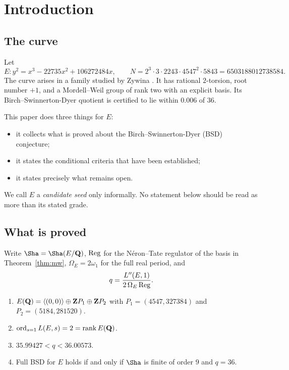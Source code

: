 \section{Introduction}\label{sec:intro}

\subsection{The curve}
Let
\[
E\colon y^2=x^3-22735x^2+106272484x,\qquad N=2^3\cdot3\cdot2243\cdot4547^2\cdot5843=6503188012738584 .
\]
The curve arises in a family studied by Zywina \cite{zywina}. It has rational $2$-torsion, root number $+1$, and a Mordell--Weil group of rank two with an explicit basis. Its Birch--Swinnerton-Dyer quotient is certified to lie within $0.006$ of $36$.

This paper does three things for $E$:
\begin{itemize}[leftmargin=*]
\item it collects what is proved about the Birch--Swinnerton-Dyer (BSD) conjecture;
\item it states the conditional criteria that have been established;
\item it states precisely what remains open.
\end{itemize}
We call $E$ a \emph{candidate seed} only informally. No statement below should be read as more than its stated grade.

\subsection{What is proved}
Write $\Sha=\Sha(E/\Q)$, $\operatorname{Reg}$ for the N\'eron--Tate regulator of the basis in Theorem~\ref{thm:mw}, $\Omega_E=2\omega_1$ for the full real period, and
\[
q=\frac{L''(E,1)}{2\,\Omega_E\operatorname{Reg}}.
\]

\begin{theorem}\label{thm:A}
\begin{enumerate}[label=(\roman*)]
\item $E(\mathbf{Q})=\langle(0,0)\rangle\oplus\mathbf{Z} P_1\oplus\mathbf{Z} P_2$ with $P_1=(4547,327384)$ and $P_2=(5184,281520)$.
\item $\operatorname{ord}_{s=1}L(E,s)=2=\operatorname{rank} E(\mathbf{Q})$.
\item $35.99427<q<36.00573$.
\item Full BSD for $E$ holds if and only if $\Sha$ is finite of order $9$ and $q=36$.
\end{enumerate}
\end{theorem}

